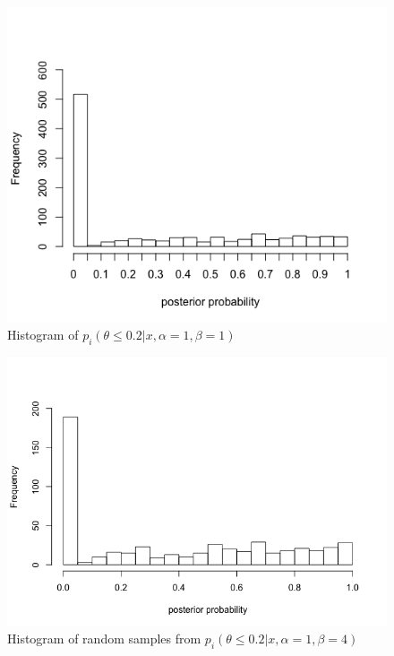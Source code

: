 \begin{figure}[h] 
\begin{center}
\includegraphics[scale=0.5]{Bayesstopflatallpost.png}
	\caption{Histogram of $p_i(\theta\leq 0.2|x,\alpha=1, \beta=1)$}
	\label{fig:bayesflatposterior}
\end{center}	
\end{figure}

\begin{figure}[h] 
\begin{center}
\includegraphics[scale=0.5]{bayesstop14allpost.png}
	\caption{Histogram of random samples from $p_i(\theta\leq 0.2|x,\alpha=1, \beta=4)$}
	\label{fig:bayes14posterior}
\end{center}	
\end{figure}

